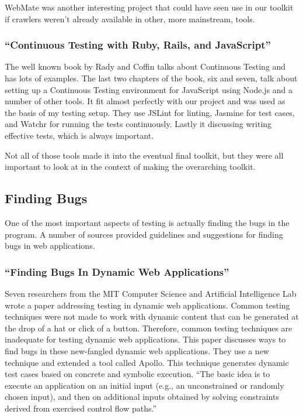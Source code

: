 \documentclass[11pt]{article}
\begin{document}
WebMate was another interesting project that could have seen use in our toolkit if crawlers weren't already available in other, more mainstream, tools.

\subsubsection{``Continuous Testing with Ruby, Rails, and JavaScript'' \cite{BookContinuousTesting}}
The well known book by Rady and Coffin talks about Continuous Testing and has lots of examples. The last two chapters of the book, six and seven, talk about setting up a Continuous Testing environment for JavaScript using Node.js and a number of other tools. It fit almost perfectly with our project and was used as the basis of my testing setup. They use JSLint for linting, Jasmine for test cases, and Watchr for running the tests continuously. Lastly it discussing writing effective tests, which is always important.

Not all of those tools made it into the eventual final toolkit, but they were all important to look at in the context of making the overarching toolkit.

\subsection{Finding Bugs}
One of the most important aspects of testing is actually finding the bugs in the program. A number of sources provided guidelines and suggestions for finding bugs in web applications.

\subsubsection{``Finding Bugs In Dynamic Web Applications'' \cite{FindingBugs}}
Seven researchers from the MIT Computer Science and Artificial Intelligence Lab wrote a paper addressing testing in dynamic web applications. Common testing techniques were not made to work with dynamic content that can be generated at the drop of a hat or click of a button. Therefore, common testing techniques are inadequate for testing dynamic web applications. This paper discusses ways to find bugs in these new-fangled dynamic web applications. They use a new technique and extended a tool called Apollo. This technique generates dynamic test cases based on concrete and symbolic execution. ``The basic idea is to execute an application on an initial input (e.g., an unconstrained or randomly chosen input), and then on additional inputs obtained by solving constraints derived from exercised control flow paths.''
\end{document}
